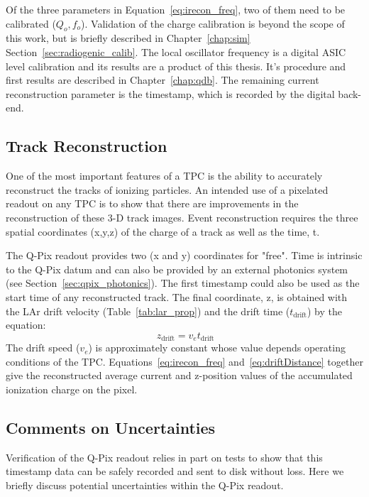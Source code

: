Of the three parameters in Equation~\ref{eq:irecon_freq}, two of them need to be calibrated ($Q_{o}, f_{o}$).
Validation of the charge calibration is beyond the scope of this work, but is briefly described in Chapter~\ref{chap:sim} Section~\ref{sec:radiogenic_calib}.
The local oscillator frequency is a digital ASIC level calibration and its results are a product of this thesis.
It's procedure and first results are described in Chapter~\ref{chap:qdb}.
The remaining current reconstruction parameter is the timestamp, which is recorded by the digital back-end.

\subsection{Track Reconstruction}
One of the most important features of a TPC is the ability to accurately reconstruct the tracks of ionizing particles.
An intended use of a pixelated readout on any TPC is to show that there are improvements in the reconstruction of these 3-D track images.
Event reconstruction requires the three spatial coordinates (x,y,z) of the charge of a track as well as the time, t. 

The Q-Pix readout provides two (x and y) coordinates for "free".
Time is intrinsic to the Q-Pix datum and can also be provided by an external photonics system (see Section~\ref{sec:qpix_photonics}).
The first timestamp could also be used as the start time of any reconstructed track.
The final coordinate, z, is obtained with the LAr drift velocity (Table~\ref{tab:lar_prop}) and the drift time ($t_{\mathrm{drift}}$) by the equation:
\begin{equation}~\label{eq:driftDistance}
  z_{\mathrm{drift}} = v_{e}t_{\mathrm{drift}}
\end{equation}
The drift speed ($v_{e}$) is approximately constant whose value depends operating conditions of the TPC.
Equations~\ref{eq:irecon_freq} and~\ref{eq:driftDistance} together give the reconstructed average current and z-position values of the accumulated ionization charge on the pixel.

\subsection{Comments on Uncertainties}
Verification of the Q-Pix readout relies in part on tests to show that this timestamp data can be safely recorded and sent to disk without loss.
Here we briefly discuss potential uncertainties within the Q-Pix readout.

